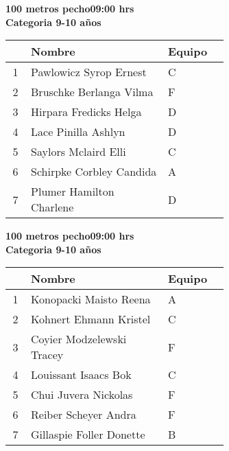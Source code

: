 \begin{minipage}{0.95\linewidth}\vspace{0.5cm} 
\begin{flushleft}
\textbf{
\hspace{-0.15cm}100 metros pecho\hspace{1.5cm}09:00 hrs \\Categoria 9-10 años}\vspace{-0.2cm} 
\end{flushleft}
\begin{tabular}{cp{0.63\linewidth}l}
\hline
& \textbf{Nombre} & \textbf{Equipo} \\ \hline
1 & Pawlowicz Syrop Ernest & C \\ 
2 & Bruschke Berlanga Vilma & F \\ 
3 & Hirpara Fredicks Helga & D \\ 
4 & Lace Pinilla Ashlyn & D \\ 
5 & Saylors Mclaird Elli & C \\ 
6 & Schirpke Corbley Candida & A \\ 
7 & Plumer Hamilton Charlene & D \\ 
\end{tabular}
\end{minipage}
\begin{minipage}{0.95\linewidth}\vspace{0.5cm} 
\begin{flushleft}
\textbf{
\hspace{-0.15cm}100 metros pecho\hspace{1.5cm}09:00 hrs \\Categoria 9-10 años}\vspace{-0.2cm} 
\end{flushleft}
\begin{tabular}{cp{0.63\linewidth}l}
\hline
& \textbf{Nombre} & \textbf{Equipo} \\ \hline
1 & Konopacki Maisto Reena & A \\ 
2 & Kohnert Ehmann Kristel & C \\ 
3 & Coyier Modzelewski Tracey & F \\ 
4 & Louissant Isaacs Bok & C \\ 
5 & Chui Juvera Nickolas & F \\ 
6 & Reiber Scheyer Andra & F \\ 
7 & Gillaspie Foller Donette & B \\ 
\end{tabular}
\end{minipage}
